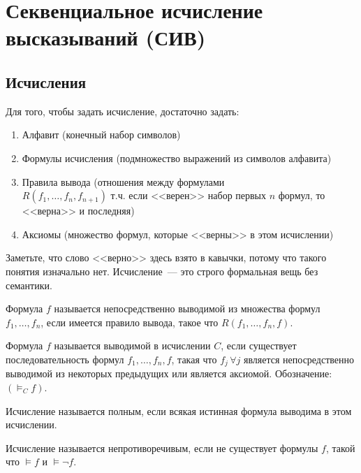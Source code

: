 \documentclass[main]{subfiles}
\begin{document}
\chapter[СИВ]{Секвенциальное исчисление высказываний (СИВ)}
\section{Исчисления}
\begin{definition}[Исчисление]
    Для того, чтобы задать исчисление, достаточно задать:
    \begin{enumerate}
        \item Алфавит (конечный набор символов)
        \item Формулы исчисления (подмножество выражений из символов алфавита)
        \item Правила вывода (отношения между формулами\\
              $R(f_1, \dots ,f_n, f_{n+1})$ т.ч. если <<верен>> набор первых $n$ формул, то <<верна>> и последняя)
        \item Аксиомы (множество формул, которые <<верны>> в этом исчислении)
    \end{enumerate}
    Заметьте, что слово <<верно>> здесь взято в кавычки, потому что такого понятия изначально нет. Исчисление~--- это строго формальная вещь без семантики.
\end{definition}
\begin{definition}
    Формула $f$ называется непосредственно выводимой из множества формул $f_1, \dots, f_n$, если имеется правило вывода, такое что $R(f_1, \dots, f_n, f)$.
\end{definition}
\begin{definition}
    Формула $f$ называется выводимой в исчислении $C$, если существует последовательность формул $f_1, \dots, f_n, f$, такая что $f_j \, \forall j$ является непосредственно выводимой из некоторых предыдущих или является аксиомой. Обозначение: $(\models_C f)$.
\end{definition}
\begin{definition}[Полнота]
    Исчисление называется полным, если всякая истинная формула выводима в этом исчислении.
\end{definition}
\begin{definition}[Непротиворечивость]
    Исчисление называется непротиворечивым, если не существует формулы $f$, такой что $\models f$ и $\models \lnot f$.
\end{definition}
\end{document}
